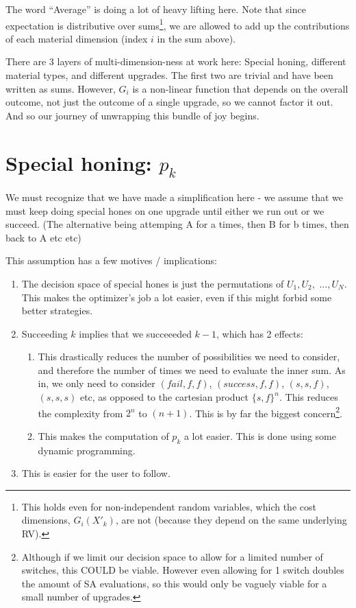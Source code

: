 \documentclass[a4paper,11pt]{article}
\begin{document}
 The word ``Average'' is doing a lot of heavy lifting here. Note that since expectation is distributive over sums\footnote{This holds even for non-independent random variables, which the cost dimensions, $G_i(X'_k)$, are not (because they depend on the same underlying RV). }, we are allowed to add up the contributions of each material dimension (index $i$ in the sum above). 
 
There are 3 layers of multi-dimension-ness at work here: Special honing, different material types, and different upgrades. The first two are trivial and have been written as sums. However, $G_i$ is a non-linear function that depends on the overall outcome, not just the outcome of a single upgrade, so we cannot factor it out. And so our journey of unwrapping this bundle of joy begins.

\newpage
\section{Special honing: $p_k$}\label{special_section}

 We must recognize that we have made a simplification here - we assume that we must keep doing special hones on one upgrade until either we run out or we succeed. (The alternative being attemping A for a times, then B for b times, then back to A etc etc)


This assumption has a few motives / implications:
\begin{enumerate}

\item The decision space of special hones is just the permutations of $ U_1, U_2,$ $\ldots , U_N$. This makes the optimizer's job a lot easier, even if this might forbid some better strategies.
\item Succeeding $k$ implies that we succeeeded $k-1$, which has 2 effects:
\begin{enumerate}
  \item This drastically reduces the number of possibilities we need to consider, and therefore the number of times we need to evaluate the inner sum. As in, we only need to consider $(fail, f, f)$, $(success, f, f )$, $(s, s, f)$, $(s, s, s)$ etc, as opposed to the cartesian product $\{s,f\}^n$. This reduces the complexity from $2^n$ to $(n+1)$. This is by far the biggest concern\footnote{Although if we limit our decision space to allow for a limited number of switches, this COULD be viable. However even allowing for 1 switch doubles the amount of SA evaluations, so this would only be vaguely viable for a small number of upgrades.}.
  \item This makes the computation of $p_k$ a lot easier. This is done using some dynamic programming.
    \end{enumerate}
  \item This is easier for the user to follow.
  
\end{enumerate}
\end{document}
